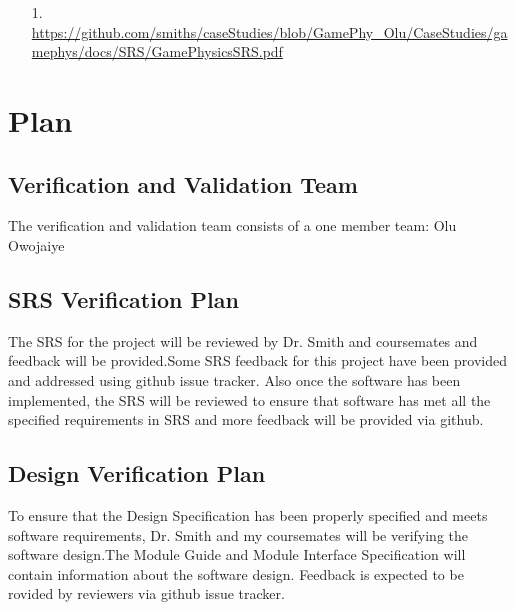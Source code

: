 \documentclass[12pt, titlepage]{article}
\begin{document}
\begin{itemize}
	\item[1.] \url {https://github.com/smiths/caseStudies/blob/GamePhy_Olu/CaseStudies/gamephys/docs/SRS/GamePhysicsSRS.pdf}
\end{itemize}


\section{Plan}
	
\subsection{Verification and Validation Team}
The verification and validation team consists of a one member team: Olu Owojaiye

\subsection{SRS Verification Plan}
The SRS for the project will be reviewed by Dr. Smith and coursemates and feedback will be provided.Some SRS feedback for this project have been provided and addressed using github issue tracker. Also once the software has been implemented, the SRS will be reviewed to ensure that software has met all the specified requirements in SRS and more feedback will be provided via github.


\subsection{Design Verification Plan}
To ensure that the Design Specification has been properly specified and meets software requirements, Dr. Smith and my coursemates will be verifying the software design.The Module Guide and Module Interface Specification will contain information about the software design. Feedback is expected to be rovided by reviewers via github issue tracker.
\end{document}
